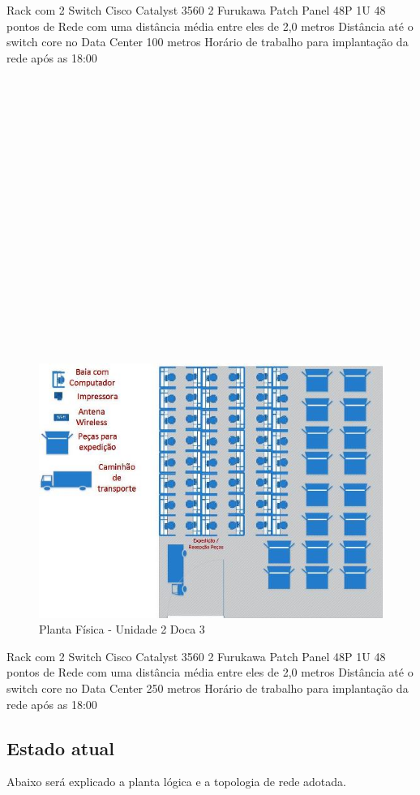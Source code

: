 \documentclass[	DIV=calc,%
							paper=a4,%
							fontsize=12pt,%
							onecolumn]{scrartcl}	 					%
\begin{document}
Rack com 2 Switch Cisco Catalyst 3560
2 Furukawa Patch Panel 48P 1U
48 pontos de Rede com uma distância média entre eles de 2,0 metros
Distância até o switch core no Data Center 100 metros
Horário de trabalho para implantação da rede após as 18:00
\\
\\
\\
\\
\\
\\
\\
\\
\\
\\
\\
\\
\\
\\
\\
\\
\\
\\
\\
\begin{figure}
	\centering
	\includegraphics[]{fig8}
	\caption{Planta Física - Unidade 2 Doca 3 }
	\label{fig8}
\end{figure}
Rack com 2 Switch Cisco Catalyst 3560
2 Furukawa Patch Panel 48P 1U
48 pontos de Rede com uma distância média entre eles de 2,0 metros
Distância até o switch core no Data Center 250 metros
Horário de trabalho para implantação da rede após as 18:00

\subsection{Estado atual}
Abaixo será explicado a planta lógica e a topologia de rede adotada.
\end{document}
